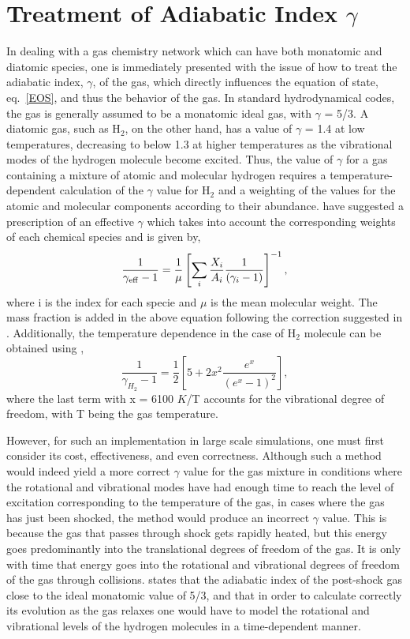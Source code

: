 \documentclass[useAMS,usenatbib]{mn2e}
\begin{document}
\section{Treatment of Adiabatic Index $\gamma$}
\label{sec:treatgamma}
In dealing with a gas chemistry network which can have both monatomic and diatomic
species, one is immediately presented with the issue of how to treat the adiabatic
index, $\gamma$, of the gas, which directly influences the equation of
state, eq.~\ref{EOS}, and thus the behavior of the gas.
In standard hydrodynamical codes, the gas is generally
assumed to be a monatomic ideal gas, with $\gamma$ = 5/3. 
A diatomic gas, such as H$_{2}$, on the other hand, has a value of $\gamma$
= 1.4 at low temperatures, decreasing to below 1.3
at higher temperatures as the vibrational modes of the hydrogen molecule become
excited. Thus, the value of $\gamma$ for a gas containing a mixture of atomic and
molecular hydrogen requires a temperature-dependent calculation of the $\gamma$
value for H$_2$ and a weighting of the values for the atomic and molecular components
according to their abundance. \cite{Yoshida:2006p13376} have suggested
a prescription of an effective $\gamma$ which takes into account the
corresponding weights of each chemical species and is given by,
\begin{equation}
\frac{1}{\gamma_{\rm eff} - 1} = \frac{1}{\mu}\left[\sum_{i}\frac{X_{i}}{A_{i}}\frac{1}{(\gamma_{i} - 1)}\right]^{-1},
\label{eq:gammaeff}
\end{equation}
where i is the index for each specie and $\mu$ is the mean molecular
weight. The mass fraction is added in the above equation following the
correction suggested in \cite{OSullivan:2009p10078}.
Additionally, the temperature dependence in the case of
H$_{2}$ molecule can be obtained using \cite{landau:1980},
\begin{equation}
\frac{1}{\gamma_{H_{2}} - 1} = \frac{1}{2}\left[ 5 +
  2x^{2}\frac{e^{x}}{(e^{x} - 1)^{2}}\right],
\label{eq:gammaH2}
\end{equation}
where the last term with  x = 6100 $K$/T accounts for the vibrational
degree of freedom, with T being the gas temperature.
%

However, for such an implementation in large scale simulations, one must first
consider its cost, effectiveness, and even correctness. Although such
a method would indeed yield a more correct $\gamma$ value for the gas
mixture in conditions where the rotational and vibrational modes have
had enough time to reach the level of excitation corresponding to
the temperature of the gas, in cases where the gas has just been
shocked, the method would produce an incorrect $\gamma$ value. 
This is because the gas that passes through shock gets rapidly heated, 
but this energy goes predominantly into the translational degrees of
freedom of the gas. It is only with time that energy goes into the rotational and
vibrational degrees of freedom of the gas through collisions. 
\cite{Flower:2003p11236} states that the adiabatic index of
the post-shock gas close to the ideal monatomic value of 5/3, 
and that in order to calculate correctly its evolution as the gas 
relaxes one would have to model the rotational and vibrational 
levels of the hydrogen molecules in a time-dependent manner.
%
\end{document}
